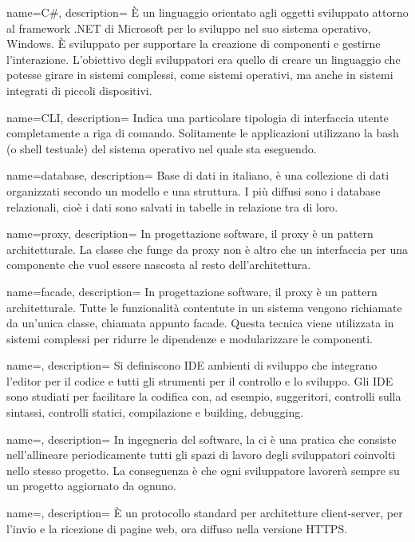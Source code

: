 {
  name=C\#,
  description={ È un linguaggio orientato agli oggetti sviluppato attorno al framework .NET di Microsoft per lo sviluppo nel suo sistema
  operativo, Windows. È sviluppato per supportare la creazione di componenti e gestirne l'interazione. L'obiettivo degli sviluppatori era
  quello di creare un linguaggio che potesse girare in sistemi complessi, come sistemi operativi, ma anche in sistemi integrati di piccoli dispositivi.}
}

{
  name=CLI,
  description={ Indica una particolare tipologia di interfaccia utente completamente a riga di comando. Solitamente le applicazioni
  utilizzano la bash (o shell testuale) del sistema operativo nel quale sta eseguendo. }
}

{
  name=database,
  description={ Base di dati in italiano, è una collezione di dati organizzati secondo un modello e una struttura. I più diffusi sono i
  database relazionali, cioè i dati sono salvati in tabelle in relazione tra di loro. }
}

{
  name={proxy},
  description={ In progettazione software, il proxy è un pattern architetturale. La classe che funge da proxy non è altro che un interfaccia
  per una componente che vuol essere nascosta al resto dell'architettura. }
}

{
  name={facade},
  description={ In progettazione software, il proxy è un pattern architetturale. Tutte le funzionalità contentute in un sistema vengono
  richiamate da un'unica classe, chiamata appunto facade. Questa tecnica viene utilizzata in sistemi complessi per ridurre le dipendenze e
  modularizzare le componenti. }
}

{
  name=,
  description={ Si definiscono IDE ambienti di sviluppo che integrano l'editor per il codice e tutti gli strumenti per il controllo e lo
  sviluppo. Gli IDE sono studiati per facilitare la codifica con, ad esempio, suggeritori, controlli sulla sintassi, controlli statici,
  compilazione e building, debugging.  }
}

{
  name=,
  description={ In ingegneria del software, la \acrlong{ci} è una pratica che consiste nell'allineare periodicamente tutti gli spazi di
  lavoro degli sviluppatori coinvolti nello stesso progetto. La conseguenza è che ogni sviluppatore lavorerà sempre su un progetto
  aggiornato da ognuno. }
}


{
  name=,
  description={ È un protocollo standard per architetture client-server, per l'invio e la ricezione di pagine web, ora diffuso nella
  versione HTTPS. }
}
